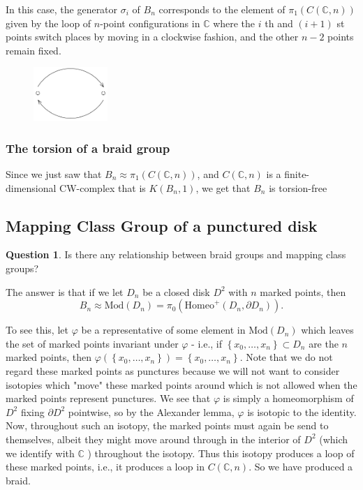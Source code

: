 \documentclass[reqno]{amsart}
\theoremstyle{definition}
\newtheorem{question}[theorem]{Question}
\theoremstyle{remark}
\newcommand{\Mod}{{\mathrm{Mod}}}
\newcommand{\Homeo}{{\mathrm{Homeo}}}
\begin{document}
In this case, the generator 
$\sigma_i$ of $B_n$ corresponds to the element
of $\pi_1 \left( C \left( \mathbb{C},n \right)  \right) $ 
given by the loop of $n$-point configurations in
$\mathbb{C}$ where the $i$ th and $\left( i+1 \right) $ st
points switch places by moving in a clockwise fashion,
and the other $n-2$ points remain fixed.

\begin{figure}[htpb]
    \centering
    \includegraphics[width=0.25\textwidth]{sigma_i_configuration.png}
    \label{fig:sigma_i_configuration-png}
\end{figure}

\subsubsection{The torsion of a braid group}

Since we just saw that
$B_n \approx \pi_1 \left( C \left( \mathbb{C},n \right)  \right) $,
and $C \left( \mathbb{C},n \right) $ 
is a finite-dimensional CW-complex that
is $K\left( B_n, 1 \right) $, we get that
$B_n$ is torsion-free~\cite[Prop~2.45]{Hatcher}


\subsection{Mapping Class Group of a punctured disk}

\begin{question}
    Is there any relationship between braid groups and
    mapping class groups?
\end{question}



The answer is that if we
let $D_n$ be a closed disk $D^2$ with $n$ marked points,
then
\[
B_n \approx \Mod\left( D_n \right) =
\pi_0 \left( \Homeo^{+} \left( D_n, \partial D_n \right)  \right).
\] 

To see this, let $\varphi$ be a representative
of some element in $\Mod \left( D_n \right) $ which
leaves the set of marked points invariant under
$\varphi$ - i.e., if $\left\{ x_0, \ldots,x_n \right\} 
\subset D_n$ are the $n$ marked points, then
$\varphi \left( \left\{ x_0, \ldots,x_n \right\}  \right) 
= \left\{ x_0, \ldots, x_n \right\} $. Note that we
do not regard these marked points as punctures because
we will not want to consider isotopies which "move" these
marked points around which is not allowed when the marked points
represent punctures.
We see that
$\varphi $ is simply a homeomorphism of $D^2$ fixing
$\partial D^2$ pointwise, so by the Alexander
lemma, $\varphi $ is isotopic to the identity. Now, throughout
such an isotopy, the marked points must again be send to
themselves, albeit they might move around through
in the interior of $D^2 $ (which we identify with
$\mathbb{C}$ ) throughout the isotopy. Thus
this isotopy produces a loop of these marked points,
i.e., it produces a loop in $C \left( \mathbb{C},n \right) $.
So we have produced a braid.
\end{document}
